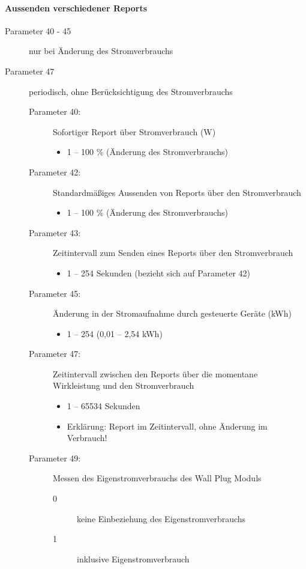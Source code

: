 \paragraph{Aussenden verschiedener Reports}
\begin{description}
	\item [Parameter 40 - 45] nur bei Änderung des Stromverbrauchs
	\item [Parameter 47] periodisch, ohne Berücksichtigung des Stromverbrauchs
	\begin{description}
		\item [Parameter 40:] Sofortiger Report über Stromverbrauch (W)
		\begin{itemize}
			\item 1 – 100 \% (Änderung des Stromverbrauchs)
		\end{itemize}
		\item [Parameter 42:] Standardmäßiges Aussenden von Reports über den Stromverbrauch
		\begin{itemize}
			\item 1 – 100 \% (Änderung des Stromverbrauchs)
		\end{itemize}
		\item [Parameter 43:] Zeitintervall zum Senden eines Reports über den Stromverbrauch
		\begin{itemize}
			\item 1 – 254 Sekunden (bezieht sich auf Parameter 42)
		\end{itemize}
		\item [Parameter 45:] Änderung in der Stromaufnahme durch gesteuerte Geräte (kWh)
		\begin{itemize}
			\item 1 – 254 (0,01 – 2,54 kWh)
		\end{itemize}
		\item [Parameter 47:] Zeitintervall zwischen den Reports über die momentane Wirkleistung und den Stromverbrauch
		\begin{itemize}
			\item 1 – 65534 Sekunden
			\item Erklärung: Report im Zeitintervall, ohne Änderung im Verbrauch!
		\end{itemize}
		\item [Parameter 49:] Messen des Eigenstromverbrauchs des Wall Plug Moduls
		\begin{description}
			\item [0] keine Einbeziehung des Eigenstromverbrauchs
			\item [1] inklusive Eigenstromverbrauch
		\end{description}
	\end{description}
\end{description}

